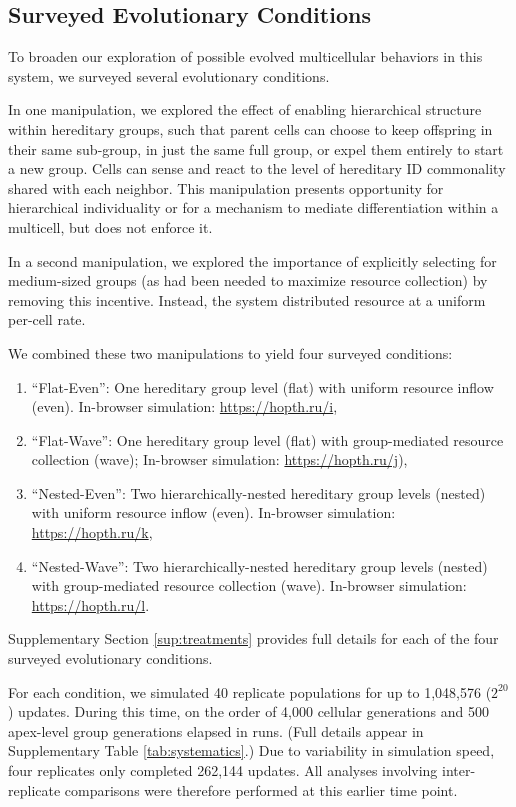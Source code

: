 \subsection{Surveyed Evolutionary Conditions}

To broaden our exploration of possible evolved multicellular behaviors in this system, we surveyed several evolutionary conditions.

In one manipulation, we explored the effect of enabling hierarchical structure within hereditary groups, such that parent cells can choose to keep offspring in their same sub-group, in just the same full group, or expel them entirely to start a new group.
Cells can sense and react to the level of hereditary ID commonality shared with each neighbor.
This manipulation presents opportunity for hierarchical individuality or for a mechanism to mediate differentiation within a multicell, but does not enforce it.

In a second manipulation, we explored the importance of explicitly selecting for medium-sized groups (as had been needed to maximize resource collection) by removing this incentive.
Instead, the system distributed resource at a uniform per-cell rate.

We combined these two manipulations to yield four surveyed conditions:
\begin{enumerate}
\item ``Flat-Even'': One hereditary group level (flat) with uniform resource inflow (even). In-browser simulation: \url{https://hopth.ru/i},
\item ``Flat-Wave'': One  hereditary group level (flat) with group-mediated resource collection (wave); In-browser simulation: \url{https://hopth.ru/j}),
\item ``Nested-Even'': Two hierarchically-nested hereditary group levels (nested) with uniform resource inflow (even). In-browser simulation: \url{https://hopth.ru/k},
\item ``Nested-Wave'': Two hierarchically-nested hereditary group levels (nested) with group-mediated resource collection (wave). In-browser simulation: \url{https://hopth.ru/l}.
\end{enumerate}

Supplementary Section \ref{sup:treatments} provides full details for each of the four surveyed evolutionary conditions.

For each condition, we simulated 40 replicate populations for up to
1,048,576 ($2^{20}$) updates.
During this time, on the order of 4,000 cellular generations and 500 apex-level group generations elapsed in runs.
(Full details appear in Supplementary Table \ref{tab:systematics}.)
Due to variability in simulation speed, four replicates only completed 262,144 updates.
All analyses involving inter-replicate comparisons were therefore performed at this earlier time point.

